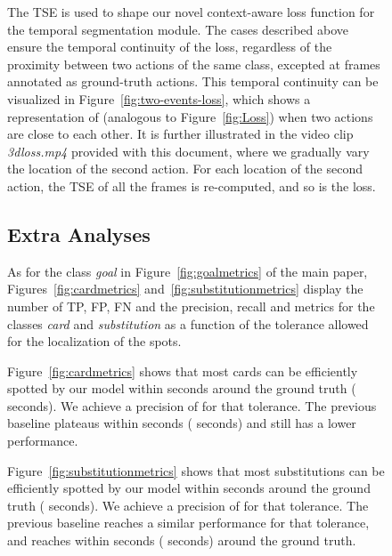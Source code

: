 \documentclass[10pt,twocolumn,letterpaper]{article}
\begin{document}
\begin{figure}[t]
{\begin{minipage}{\linewidth}
The TSE is used to shape our novel context-aware loss function for the temporal segmentation module. The cases described above ensure the temporal continuity of the loss, regardless of the proximity between two actions of the same class, excepted at frames annotated as ground-truth actions. This temporal continuity can be visualized in Figure~\ref{fig:two-events-loss}, which shows a representation of  (analogous to Figure~\ref{fig:Loss}) when two actions are close to each other. It is further illustrated in the video clip \emph{3dloss.mp4} provided with this document, where we gradually vary the location of the second action. For each location of the second action, the TSE of all the frames is re-computed, and so is the loss.









\subsection{Extra Analyses}

 As for the class \emph{goal} in Figure~\ref{fig:goalmetrics} of the main paper, Figures~\ref{fig:cardmetrics} and~\ref{fig:substitutionmetrics} display the number of TP, FP, FN and the precision, recall and  metrics for the classes \emph{card} and \emph{substitution} as a function of the tolerance  allowed for the localization of the spots. 

Figure~\ref{fig:cardmetrics} shows that most cards can be efficiently spotted by our model within  seconds around the ground truth ( seconds). We achieve a precision of  for that tolerance. The previous baseline plateaus within  seconds ( seconds) and still has a lower performance. 

Figure~\ref{fig:substitutionmetrics} shows that most substitutions can be efficiently spotted by our model within  seconds around the ground truth ( seconds). We achieve a precision of  for that tolerance. The previous baseline reaches a similar performance for that tolerance, and reaches  within  seconds ( seconds) around the ground truth. 


\end{minipage}}
\end{figure}
\end{document}
